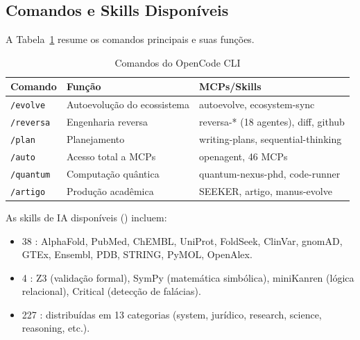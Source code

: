 \subsection{Comandos e Skills Disponíveis}
A Tabela~\ref{tab:comandos-opencode} resume os comandos principais e suas
funções.
\begin{table}[htb]
\centering
\caption{Comandos do OpenCode CLI}
\label{tab:comandos-opencode}
\begin{tabular}{lll}
\toprule
\textbf{Comando} & \textbf{Função} & \textbf{MCPs/Skills} \\
\midrule
\texttt{/evolve} & Autoevolução do ecossistema & autoevolve, ecosystem-sync \\
\texttt{/reversa} & Engenharia reversa & reversa-* (18 agentes), diff, github \\
\texttt{/plan} & Planejamento & writing-plans, sequential-thinking \\
\texttt{/auto} & Acesso total a MCPs & openagent, 46 MCPs \\
\texttt{/quantum} & Computação quântica & quantum-nexus-phd, code-runner \\
\texttt{/artigo} & Produção acadêmica & SEEKER, artigo, manus-evolve \\
\bottomrule
\end{tabular}
\end{table}
As skills de IA disponíveis (\cite{opencode2026scanner, opencode2026spec036})
incluem:
\begin{itemize}
\item 38 : AlphaFold, PubMed, ChEMBL, UniProt,
FoldSeek, ClinVar, gnomAD, GTEx, Ensembl, PDB, STRING, PyMOL, OpenAlex.
\item 4 : Z3 (validação formal), SymPy (matemática
simbólica), miniKanren (lógica relacional), Critical (detecção de falácias).
\item 227 : distribuídas em 13 categorias (system,
jurídico, research, science, reasoning, etc.).
\end{itemize}
